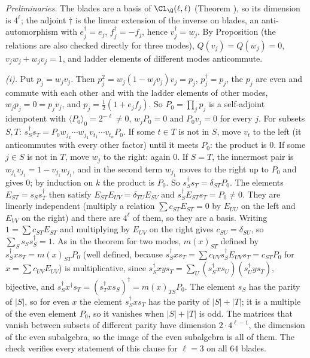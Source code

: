 \emph{Preliminaries.} The blades are a basis of $\Cl_{\Q}(\ell,\ell)$ (Theorem ), so its dimension is $4^{\ell}$; the adjoint $\dagger$ is the linear extension of the inverse on blades, an anti-automorphism with $e_{j}^{\dagger} = e_{j}$, $f_{j}^{\dagger} = -f_{j}$, hence $v_{j}^{\dagger} = w_{j}$. By Proposition  (the relations are also checked directly for three modes), $Q(v_{j}) = Q(w_{j}) = 0$, $v_{j}w_{j} + w_{j}v_{j} = 1$, and ladder elements of different modes anticommute.

\emph{(i).} Put $p_{j} = w_{j}v_{j}$. Then $p_{j}^{2} = w_{j}(1 - w_{j}v_{j})v_{j} = p_{j}$, $p_{j}^{\dagger} = p_{j}$, the $p_{j}$ are even and commute with each other and with the ladder elements of other modes, $w_{j}p_{j} = 0 = p_{j}v_{j}$, and $p_{j} = \tfrac12(1 + e_{j}f_{j})$. So $P_{0} = \prod_{j}p_{j}$ is a self-adjoint idempotent with $\langle P_{0}\rangle_{0} = 2^{-\ell} \ne 0$, $w_{j}P_{0} = 0$ and $P_{0}v_{j} = 0$ for every $j$. For subsets $S, T$: $s_{S}^{\dagger}s_{T} = P_{0}w_{j_{k}}\cdots w_{j_{1}}v_{t_{1}}\cdots v_{t_{n}}P_{0}$. If some $t \in T$ is not in $S$, move $v_{t}$ to the left (it anticommutes with every other factor) until it meets $P_{0}$: the product is $0$. If some $j \in S$ is not in $T$, move $w_{j}$ to the right: again $0$. If $S = T$, the innermost pair is $w_{j_{1}}v_{j_{1}} = 1 - v_{j_{1}}w_{j_{1}}$, and in the second term $w_{j_{1}}$ moves to the right up to $P_{0}$ and gives $0$; by induction on $k$ the product is $P_{0}$. So $s_{S}^{\dagger}s_{T} = \delta_{ST}P_{0}$. The elements $E_{ST} = s_{S}s_{T}^{\dagger}$ then satisfy $E_{ST}E_{UV} = \delta_{TU}E_{SV}$ and $s_{S}^{\dagger}E_{ST}s_{T} = P_{0} \ne 0$. They are linearly independent (multiply a relation $\sum c_{ST}E_{ST} = 0$ by $E_{UU}$ on the left and $E_{VV}$ on the right) and there are $4^{\ell}$ of them, so they are a basis. Writing $1 = \sum c_{ST}E_{ST}$ and multiplying by $E_{UV}$ on the right gives $c_{SU} = \delta_{SU}$, so $\sum_{S}s_{S}s_{S}^{\dagger} = 1$. As in the theorem for two modes, $m(x)_{ST}$ defined by $s_{S}^{\dagger}xs_{T} = m(x)_{ST}P_{0}$ (well defined, because $s_{S}^{\dagger}xs_{T} = \sum c_{UV}s_{S}^{\dagger}E_{UV}s_{T} = c_{ST}P_{0}$ for $x = \sum c_{UV}E_{UV}$) is multiplicative, since $s_{S}^{\dagger}xys_{T} = \sum_{U}(s_{S}^{\dagger}xs_{U})(s_{U}^{\dagger}ys_{T})$, bijective, and $s_{S}^{\dagger}x^{\dagger}s_{T} = (s_{T}^{\dagger}xs_{S})^{\dagger} = m(x)_{TS}P_{0}$. The element $s_{S}$ has the parity of $|S|$, so for even $x$ the element $s_{S}^{\dagger}xs_{T}$ has the parity of $|S| + |T|$; it is a multiple of the even element $P_{0}$, so it vanishes when $|S| + |T|$ is odd. The matrices that vanish between subsets of different parity have dimension $2 \cdot 4^{\ell-1}$, the dimension of the even subalgebra, so the image of the even subalgebra is all of them. The check verifies every statement of this clause for $\ell = 3$ on all $64$ blades.

